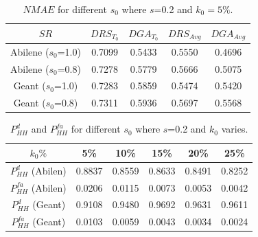\begin{table}
	\centering
 \small{
		\begin{tabular}{| c | c | c | c | c |}
		\hline
       $SR$                 &    $DRS_{T_{0}}$  &  $DGA_{T_{0}}$  &  $DRS_{Avg}$ &  $DGA_{Avg}$ \\ \hline
      Abilene ($s_{0}$=1.0) & 0.7099 & 0.5433 & 0.5550 & 0.4696        \\ \hline
      Abilene ($s_{0}$=0.8) & 0.7278 & 0.5779 & 0.5666 & 0.5075        \\ \hline
      Geant ($s_{0}$=1.0)   & 0.7283 & 0.5859 & 0.5474 & 0.5420         \\ \hline
      Geant ($s_{0}$=0.8)   & 0.7311 & 0.5936 & 0.5697 & 0.5568         \\ \hline
    \end{tabular}
	\caption{{$NMAE$ for different $s_{0}$ where $s$=0.2 and $k_{0}=5\%$.}}
	\label{tab:NMAEDGA}
}
\end{table}



\begin{table}
	\centering
 \small{
		\begin{tabular}{| c | c | c | c | c | c |}
		\hline
       $k_{0}\%$             &  5\%  &  10\%  &  15\%  & 20\%  & 25\% \\ \hline
      $P^{d}_{HH}$ (Abilen)  & 0.8837 & 0.8559 & 0.8633 & 0.8491 & 0.8252        \\ \hline
      $P^{fa}_{HH}$ (Abilen) & 0.0206 & 0.0115 & 0.0073 & 0.0053 & 0.0042       \\ \hline
      $P^{d}_{HH}$ (Geant)   & 0.9108 & 0.9480 & 0.9692 & 0.9631 & 0.9611        \\ \hline
      $P^{fa}_{HH}$ (Geant)  & 0.0103 & 0.0059 & 0.0043 & 0.0034 & 0.0024        \\ \hline
    \end{tabular}
	\caption{{$P^{d}_{HH}$ and $P^{fa}_{HH}$ for different $s_{0}$ where $s$=0.2 and $k_{0}$ varies.}}
	\label{tab:PdPfaDGA}
}
\end{table}





